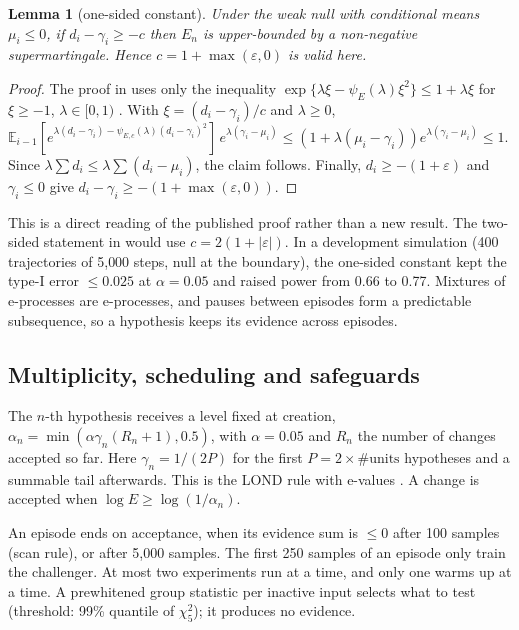 \documentclass[11pt]{article}
\newtheorem{lemma}{Lemma}
\theoremstyle{remark}
\newcommand{\E}{\mathbb{E}}
\begin{document}
\begin{lemma}[one-sided constant]\label{lem:c}
Under the weak null with conditional means $\mu_i\le 0$, if $d_i-\gamma_i\ge -c$ then $E_n$ is upper-bounded by a non-negative supermartingale. Hence $c=1+\max(\varepsilon,0)$ is valid here.
\end{lemma}
\begin{proof}
The proof in \citet[§A.8]{howard2021cs} uses only the inequality $\exp\{\lambda\xi-\psi_E(\lambda)\xi^2\}\le 1+\lambda\xi$ for $\xi\ge-1$, $\lambda\in[0,1)$ \citep{fan2015}. With $\xi=(d_i-\gamma_i)/c$ and $\lambda\ge 0$,
$\E_{i-1}[e^{\lambda(d_i-\gamma_i)-\psi_{E,c}(\lambda)(d_i-\gamma_i)^2}]\,e^{\lambda(\gamma_i-\mu_i)}\le(1+\lambda(\mu_i-\gamma_i))e^{\lambda(\gamma_i-\mu_i)}\le1$.
Since $\lambda\sum d_i\le\lambda\sum(d_i-\mu_i)$, the claim follows. Finally, $d_i\ge-(1+\varepsilon)$ and $\gamma_i\le 0$ give $d_i-\gamma_i\ge -(1+\max(\varepsilon,0))$.
\end{proof}
This is a direct reading of the published proof rather than a new result. The two-sided statement in \citet{choe2024comparing} would use $c=2(1+|\varepsilon|)$. In a development simulation (400 trajectories of 5{,}000 steps, null at the boundary), the one-sided constant kept the type-I error $\le 0.025$ at $\alpha=0.05$ and raised power from 0.66 to 0.77. Mixtures of e-processes are e-processes, and pauses between episodes form a predictable subsequence, so a hypothesis keeps its evidence across episodes.

\subsection{Multiplicity, scheduling and safeguards}
The $n$-th hypothesis receives a level fixed at creation, $\alpha_n=\min(\alpha\gamma_n(R_n+1),0.5)$, with $\alpha=0.05$ and $R_n$ the number of changes accepted so far. Here $\gamma_n = 1/(2P)$ for the first $P = 2\times\#\text{units}$ hypotheses and a summable tail afterwards. This is the LOND rule with e-values \citep{javanmard2018lond,xu2024elond}. A change is accepted when $\log E\ge\log(1/\alpha_n)$.

An episode ends on acceptance, when its evidence sum is $\le 0$ after 100 samples (scan rule), or after 5{,}000 samples. The first 250 samples of an episode only train the challenger. At most two experiments run at a time, and only one warms up at a time. A prewhitened group statistic per inactive input selects what to test (threshold: 99\% quantile of $\chi^2_5$); it produces no evidence.
\end{document}
